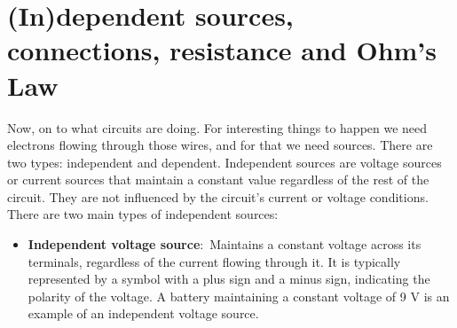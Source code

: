 \documentclass[nobib]{tufte-handout}
\newcommand{\defn}[2]{\noindent\textbf{#1}:\ #2}
\begin{document}
\section{(In)dependent sources, connections, resistance and Ohm's Law}
Now, on to what circuits are doing. For interesting things
to happen we need electrons flowing through those wires,
and for that we need sources. There are two types: independent and dependent.
Independent sources are voltage sources or current sources 
that maintain a constant value regardless of the rest of the 
circuit. They are not influenced by the circuit's current or 
voltage conditions. There are two main types of independent 
sources:
\begin{itemize}
    \item \defn{Independent voltage source}{Maintains a constant 
    voltage across its terminals, regardless of the current 
    flowing through it. It is typically represented by a 
    symbol with a plus sign and a minus sign, indicating 
    the polarity of the voltage.} A battery maintaining a constant
    voltage of 9 V is an example of an independent voltage source.
    \begin{marginfigure}
        \centering

\end{marginfigure}
\end{itemize}
\end{document}

